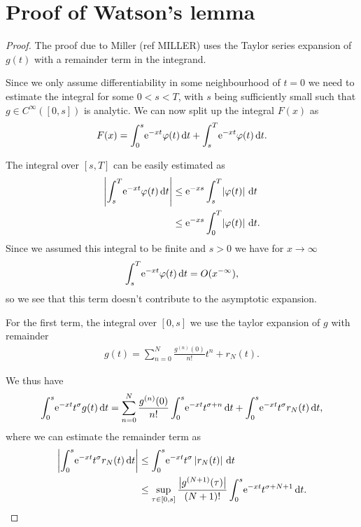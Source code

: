 \section{Proof of Watson's lemma}
\label{sec:proof-watson}
\begin{theorem}
    
    \begin{proof}
        The proof due to Miller (ref MILLER) uses the Taylor series expansion of
        $g(t)$ with a remainder term in the integrand.

        Since we only assume differentiability in some neighbourhood of $t=0$ we
        need to estimate the integral for some $0 < s < T$, with $s$ being
        sufficiently small such that $g\in C^{\infty}([0,s])$ is analytic. We
        can now split up the integral $F(x)$ as
        \begin{align*}
            F(x) = \Integ[s]{0}{t}{\Eto{-xt}\phi(t)} +
                   \Integ[T]{s}{t}{\Eto{-xt}\phi(t)}.
        \end{align*}

        The integral over $\left[s,T\right]$ can be easily estimated as
        \begin{align*}
            \left|\Integ[T]{s}{t}{\Eto{-xt}\phi(t)}\right| &\le
            \Eto{-xs} \Integ[T]{s}{t}{\left|\phi(t)\right|} \\
            &\le \Eto{-xs}\Integ[T]{0}{t}{\left|\phi(t)\right|}.
        \end{align*}
        Since we assumed this integral to be finite and $s>0$ we have for
        $x\to\infty$
        \begin{align}
            \Integ[T]st{\Eto{-xt}\phi(t)} = O(x^{-\infty}),
        \end{align}
        so we see that this term doesn't contribute to the asymptotic expansion.

        For the first term, the integral over $\left[0,s\right]$ we use the
        taylor expansion of $g$ with remainder
        \begin{align*}
            g(t) = \sum_{n=0}^{N} \frac{g^{(n)}(0)}{n!}t^n + r_N(t).
        \end{align*}

        We thus have
        \begin{align*}
            \Integ[s]0t{\Eto{-xt}t^\sigma g(t)} = \sum_{n=0}^N
            \frac{g^{(n)}(0)}{n!} \Integ[s]0t{\Eto{-xt}t^{\sigma+n}} +
            \Integ[s]0t{\Eto{-xt}t^\sigma r_N(t)},
        \end{align*}
        where we can estimate the remainder term as
        \begin{align*}
            \left|\Integ[s]0t{\Eto{-xt}t^\sigma r_N(t)}\right| &\le
            \Integ[s]0t{\Eto{-xt}t^\sigma\left|r_N(t)\right|} \\
            &\le \sup_{\tau\in\left[0,s\right]}
            \frac{\bigl|g^{(N+1)}(\tau)\bigr|}{(N+1)!}\Integ[s]0t{\Eto{-xt}t^{\sigma+N+1}}.
        \end{align*}


\end{proof}
\end{theorem}
